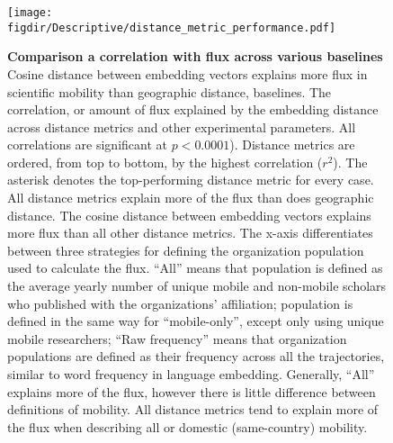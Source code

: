 \documentclass[12pt,a4paper]{article}
\def\figdir{../Figs}
\newcommand{\mycaption}[2]{%
  \caption[#1]{\textbf{#1} \small#2}%
}
\begin{document}
\clearpage
%
%
\begin{figure}[p!]
	\centering
	\texttt{[image: \\figdir/Descriptive/distance\_metric\_performance.pdf]}
		\mycaption
		{Comparison a correlation with flux across various baselines}
		{
		Cosine distance between embedding vectors explains more flux in scientific mobility than geographic distance, baselines.
		The correlation, or amount of flux explained by the embedding distance across distance metrics and other experimental parameters. 
		All correlations are significant at $p < 0.0001$). 
		Distance metrics are ordered, from top to bottom, by the highest correlation ($r^{2}$). 
		The asterisk denotes the top-performing distance metric for every case. 
		All distance metrics explain more of the flux than does geographic distance.
		The cosine distance between embedding vectors explains more flux than all other distance metrics. 
		The x-axis differentiates between three strategies for defining the organization population used to calculate the flux. 
		``All'' means that population is defined as the average yearly number of unique mobile and non-mobile scholars who published with the organizations' affiliation;
		population is defined in the same way for ``mobile-only'', except only using unique mobile researchers;
		``Raw frequency'' means that organization populations are defined as their frequency across all the trajectories, similar to word frequency in language embedding. 
		Generally, ``All'' explains more of the flux, however there is little difference between definitions of mobility.
		All distance metrics tend to explain more of the flux when describing all or domestic (same-country) mobility.	
		}
	\label{fig:supp:distancemetrics}
\end{figure}
\end{document}
